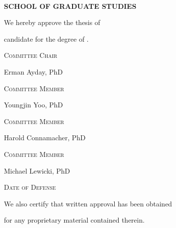 \newcommand{\approvalparsep}{\vspace{0.3in}}

\begin{center}

\MakeUppercase{\textbf{\thesisInstitution \\ School of Graduate Studies}}

\approvalparsep

We hereby approve the thesis of

\thesisAuthor

candidate for the degree of \thesisDegree.

\approvalparsep

\textsc{Committee Chair}

Erman Ayday, PhD

\approvalparsep

\textsc{Committee Member}

Youngjin Yoo, PhD

\approvalparsep

\textsc{Committee Member}

Harold Connamacher, PhD

\approvalparsep

\textsc{Committee Member}

Michael Lewicki, PhD

\approvalparsep

\textsc{Date of Defense}

\thesisDefenseDate

\approvalparsep

We also certify that written approval has been obtained

for any proprietary material contained therein.
\end{center}